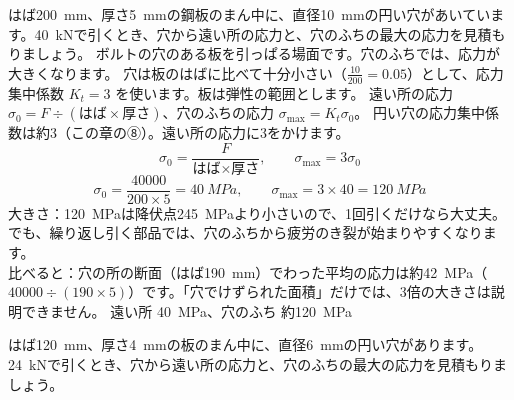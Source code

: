 \begin{phreidai}[穴のあいた板の応力集中]
\label{ph:力-8:ex13}はば\qty{200}{mm}、厚さ\qty{5}{mm}の鋼板のまん中に、直径\qty{10}{mm}の円い穴があいています。\qty{40}{kN}で引くとき、穴から遠い所の応力と、穴のふちの最大の応力を見積もりましょう。
\phbamen
ボルトの穴のある板を引っぱる場面です。穴のふちでは、応力が大きくなります。
\phmushi
穴は板のはばに比べて十分小さい（$\tfrac{10}{200}=0.05$）として、応力集中係数 $K_t=3$ を使います。板は弾性の範囲とします。
\phzu
遠い所の応力 $\sigma_0=F\div(\text{はば}\times\text{厚さ})$、穴のふちの応力 $\sigma_{\max}=K_t\sigma_0$。
\phriyu
円い穴の応力集中係数は約3（この章の⑧）。遠い所の応力に3をかけます。
\phtateru
\[\sigma_0=\frac{F}{\text{はば}\times\text{厚さ}},\qquad \sigma_{\max}=3\sigma_0\]
\phtoku
\[\sigma_0=\frac{\num{40000}}{200\times5}=\qty{40}{MPa},\qquad \sigma_{\max}=3\times40=\qty{120}{MPa}\]
\phtashikame
大きさ：\qty{120}{MPa}は降伏点\qty{245}{MPa}より小さいので、1回引くだけなら大丈夫。でも、繰り返し引く部品では、穴のふちから疲労のき裂が始まりやすくなります。\\
比べると：穴の所の断面（はば\qty{190}{mm}）でわった平均の応力は約\qty{42}{MPa}（$\num{40000}\div(190\times5)$）です。「穴でけずられた面積」だけでは、3倍の大きさは説明できません。
\kotae 遠い所 \qty{40}{MPa}、穴のふち 約\qty{120}{MPa}
\end{phreidai}
\begin{jibun}
はば\qty{120}{mm}、厚さ\qty{4}{mm}の板のまん中に、直径\qty{6}{mm}の円い穴があります。\qty{24}{kN}で引くとき、穴から遠い所の応力と、穴のふちの最大の応力を見積もりましょう。
\end{jibun}

